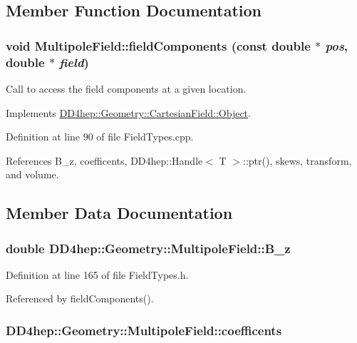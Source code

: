 \subsection{Member Function Documentation}
\hypertarget{class_d_d4hep_1_1_geometry_1_1_multipole_field_a06782e6f0fbdfcf53394ee5dda83b052}{
\subsubsection[{fieldComponents}]{\setlength{\rightskip}{0pt plus 5cm}void MultipoleField::fieldComponents (const double $\ast$ {\em pos}, \/  double $\ast$ {\em field})}}
\label{class_d_d4hep_1_1_geometry_1_1_multipole_field_a06782e6f0fbdfcf53394ee5dda83b052}


Call to access the field components at a given location. 

Implements \hyperlink{class_d_d4hep_1_1_geometry_1_1_cartesian_field_1_1_object_ab3fa7f39545c8b0f769ee1ddfd03ed90}{DD4hep::Geometry::CartesianField::Object}.

Definition at line 90 of file FieldTypes.cpp.

References B\_\-z, coefficents, DD4hep::Handle$<$ T $>$::ptr(), skews, transform, and volume.

\subsection{Member Data Documentation}
\hypertarget{class_d_d4hep_1_1_geometry_1_1_multipole_field_a5b182acb00dda0675a4166293230e948}{
\subsubsection[{B\_\-z}]{\setlength{\rightskip}{0pt plus 5cm}double {\bf DD4hep::Geometry::MultipoleField::B\_\-z}}}
\label{class_d_d4hep_1_1_geometry_1_1_multipole_field_a5b182acb00dda0675a4166293230e948}


Definition at line 165 of file FieldTypes.h.

Referenced by fieldComponents().\hypertarget{class_d_d4hep_1_1_geometry_1_1_multipole_field_a0d73fa0209b6773df83c05b53060324a}{
\subsubsection[{coefficents}]{ {\bf DD4hep::Geometry::MultipoleField::coefficents}}}
\label{class_d_d4hep_1_1_geometry_1_1_multipole_field_a0d73fa0209b6773df83c05b53060324a}


